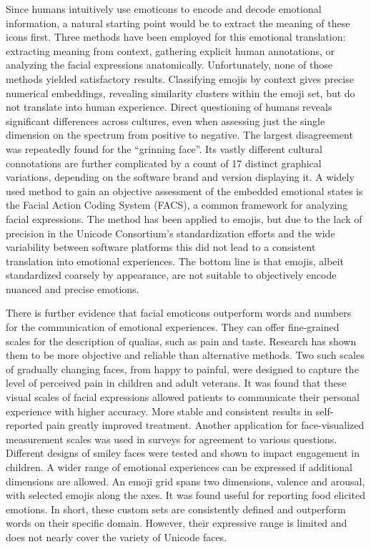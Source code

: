 Since humans intuitively use emoticons to encode and decode emotional information, a natural
starting point would be to extract the meaning of these icons first. Three methods have been employed
for this emotional translation: extracting meaning from context, gathering explicit human annotations,
or analyzing the facial expressions anatomically. Unfortunately, none of those methods yielded satisfactory
results. Classifying emojis by context gives precise numerical embeddings, revealing similarity clusters
within the emoji set\cite{WhatDoesThisEmojiMean}, but do not translate into human experience.
Direct questioning of humans reveals significant differences across cultures,
even when assessing just the single dimension on the spectrum from positive to negative\cite{emoji_intensity}.
The largest disagreement was repeatedly found for the ``grinning face''.
Its vastly different cultural connotations are further complicated by a count of 17 distinct graphical variations,
depending on the software brand and version displaying it\cite{emoji_interpretation}.
A widely used method to gain an objective assessment of the embedded emotional states is the Facial
Action Coding System (FACS), a common framework for analyzing facial expressions.
The method has been applied to emojis, but due to the lack of precision in the Unicode Consortium's
standardization efforts and the wide variability between software platforms this did not lead to
a consistent translation into emotional experiences\cite{emoji_facs}.
The bottom line is that emojis, albeit standardized coarsely by appearance, are
not suitable to objectively encode nuanced and precise emotions.

There is further evidence that facial emoticons outperform words and numbers for the communication of emotional experiences.
They can offer fine-grained scales for the description of qualias, such as pain and taste.
Research has shown them to be more objective and reliable than alternative methods.
Two such scales of gradually changing faces, from happy to painful, were designed to capture the level of perceived pain
in children\cite{bakerwong} and adult veterans\cite{dvprs}. It was found that these visual scales of facial expressions
allowed patients to communicate their personal experience with higher accuracy.
More stable and consistent results in self-reported pain greatly improved treatment.
Another application for face-visualized measurement scales was used in surveys for agreement to various questions.
Different designs of smiley faces were tested and shown to impact engagement in children\cite{likertscale}.
A wider range of emotional experiences can be expressed if additional dimensions are allowed.
An emoji grid spans two dimensions, valence and arousal, with selected emojis along the axes\cite{emojigrid}.
It was found useful for reporting food elicited emotions.
In short, these custom sets are consistently defined and outperform words on their specific domain.
However, their expressive range is limited and does not nearly cover the variety of Unicode faces.

